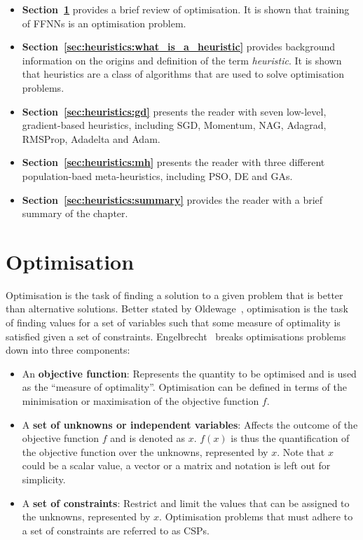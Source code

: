 \begin{itemize}
      \item \textbf{Section~\ref{sec:heuristics:optimisation}} provides a brief review of optimisation. It is shown that training of \acp{FFNN} is an optimisation problem.

      \item \textbf{Section~\ref{sec:heuristics:what_is_a_heuristic}} provides background information on the origins and definition of the term \textit{heuristic}. It is shown that heuristics are a class of algorithms that are used to solve optimisation problems.

      \item \textbf{Section~\ref{sec:heuristics:gd}} presents the reader with seven low-level, gradient-based heuristics, including \acf{SGD}, \acf{Momentum}, \acf{NAG}, \acf{Adagrad}, \acf{RMSProp}, \acf{Adadelta} and \acf{Adam}.

      \item \textbf{Section~\ref{sec:heuristics:mh}} presents the reader with three different population-baed meta-heuristics, including \acf{PSO}, \acf{DE} and \acfp{GA}.

      \item \textbf{Section~\ref{sec:heuristics:summary}} provides the reader with a brief summary of the chapter.
\end{itemize}

\section{Optimisation}\label{sec:heuristics:optimisation}

Optimisation is the task of finding a solution to a given problem that is better than alternative solutions. Better stated by Oldewage~\cite{ref:oldewage:2017}, optimisation is the task of finding values for a set of variables such that some measure of optimality is satisfied given a set of constraints. Engelbrecht~\cite{ref:engelbrecht:2007} breaks optimisations problems down into three components:

\begin{itemize}
      \item An \textbf{objective function}: Represents the quantity to be optimised and is used as the ``measure of optimality''. Optimisation can be defined in terms of the minimisation or maximisation of the objective function $f$.

      \item A \textbf{set of unknowns or independent variables}: Affects the outcome of the objective function $f$ and is denoted as $x$. $f(x)$ is thus the quantification of the objective function over the unknowns, represented by $x$. Note that $x$ could be a scalar value, a vector or a matrix and notation is left out for simplicity.

      \item A \textbf{set of constraints}: Restrict and limit the values that can be assigned to the unknowns, represented by $x$. Optimisation problems that must adhere to a set of constraints are referred to as \acfp{CSP}.
\end{itemize}

